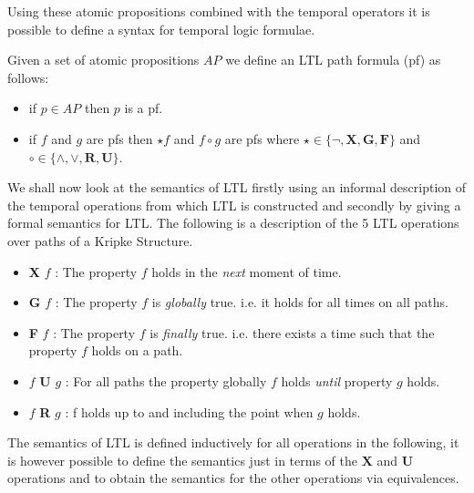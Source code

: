 Using these atomic propositions combined with the temporal operators it is possible to define a syntax for temporal logic formulae.
\medskip
\begin{mydef}
Given a set of atomic propositions $AP$ we define an LTL path formula (pf) as follows:

\begin{itemize}
\item if $p \in AP$ then $p$ is a pf.

\item if $f$ and $g$ are pfs then $\star f$ and $f \circ g$ are pfs where $\star \in \{\neg,\mathbf{X},\mathbf{G}, \mathbf{F}\}$ and $\circ \in \{ \wedge,\vee,\textbf{R},\textbf{U} \}$.
\end{itemize}

\end{mydef}
\medskip
We shall now look at the semantics of LTL firstly using an informal description of the temporal operations from which LTL is constructed and secondly by giving a formal semantics for LTL. The following is a description of the 5 LTL operations over paths of a Kripke Structure.
\begin{itemize}
\item \textbf{X} $f$ : The property $f$ holds in the \emph{next} moment of time.
\item \textbf{G} $f$ : The property $f$ is \emph{globally} true. i.e. it holds for all times on all paths. 
\item \textbf{F} $f$ : The property $f$ is \emph{finally} true. i.e. there exists a time such that the property $f$ holds on a path.
\item $f$ \textbf{U} $g$ : For all paths the property globally $f$ holds \emph{until} property $g$ holds. 
\item $f$ \textbf{R} $g$ : f holds up to and including the point when $g$ holds.
\end{itemize}


The semantics of LTL is defined inductively for all operations in the following, it is however possible to define the semantics just in terms of the $\mathbf{X}$ and $\mathbf{U}$ operations and to obtain the semantics for the other operations via equivalences.

